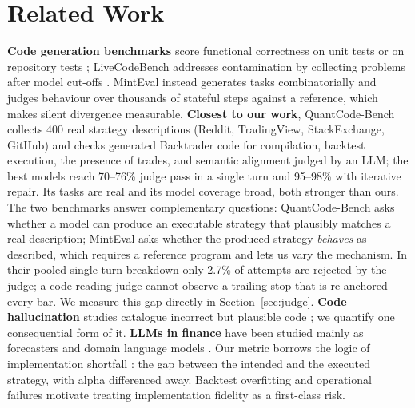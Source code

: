 \documentclass[sigconf,anonymous,review]{acmart}
\begin{document}
\section{Related Work}
\textbf{Code generation benchmarks} score functional correctness on unit tests
\cite{chen2021humaneval,austin2021mbpp,liu2023evalplus,lai2023ds1000,zhuo2024bigcodebench} or on
repository tests \cite{jimenez2024swebench}; LiveCodeBench addresses contamination by collecting
problems after model cut-offs \cite{jain2024livecodebench}. MintEval instead generates tasks
combinatorially and judges behaviour over thousands of stateful steps against a reference, which
makes silent divergence measurable. \textbf{Closest to our work}, QuantCode-Bench \cite{khoroshilov2026quantcode} collects 400 real strategy
descriptions (Reddit, TradingView, StackExchange, GitHub) and checks generated Backtrader code for
compilation, backtest execution, the presence of trades, and semantic alignment judged by an LLM;
the best models reach 70--76\% judge pass in a single turn and 95--98\% with iterative repair. Its
tasks are real and its model coverage broad, both stronger than ours. The two benchmarks answer
complementary questions: QuantCode-Bench asks whether a model can produce an executable strategy
that plausibly matches a real description; MintEval asks whether the produced strategy
\emph{behaves} as described, which requires a reference program and lets us vary the mechanism.
In their pooled single-turn breakdown only 2.7\% of attempts are rejected by the judge; a
code-reading judge cannot observe a trailing stop that is re-anchored every bar. We measure this
gap directly in Section~\ref{sec:judge}. \textbf{Code hallucination} studies catalogue incorrect but
plausible code \cite{tian2024codehalu,zhang2024hallucode}; we quantify one consequential form of it.
\textbf{LLMs in finance} have been studied mainly as forecasters and domain language models
\cite{lopezlira2023chatgpt,wu2023bloomberggpt,yang2023fingpt}. Our metric borrows the logic of
implementation shortfall \cite{perold1988implementation}: the gap between the intended and the
executed strategy, with alpha differenced away. Backtest overfitting \cite{bailey2014pseudo,bailey2016pbo}
and operational failures \cite{sec2013knight} motivate treating implementation fidelity as a
first-class risk.
\end{document}
